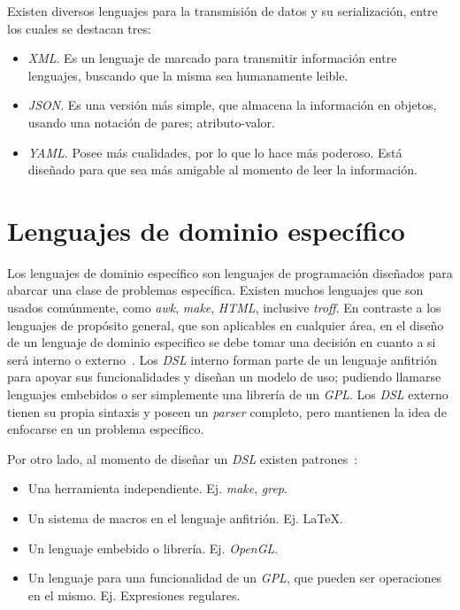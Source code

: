 \documentclass[12pt,letterpaper,titlepage,oneside,openright]{book}
\newcommand{\latex}{\LaTeX\xspace}
\begin{document}
Existen diversos lenguajes para la transmisión de datos y su serialización, entre los cuales se destacan tres:

\begin{itemize}
    \item \textit{XML}. Es un lenguaje de marcado para transmitir información entre lenguajes, buscando que la misma sea humanamente leible.
    \item \textit{JSON}. Es una versión más simple, que almacena la información en objetos, usando una notación de pares; atributo-valor. 
    \item \textit{YAML}. Posee más cualidades, por lo que lo hace más poderoso. Está diseñado para que sea más amigable al momento de leer la información.
\end{itemize}

\section{Lenguajes de dominio específico}

Los lenguajes de dominio específico son lenguajes de programación diseñados para abarcar una clase de problemas específica. Existen muchos lenguajes que son usados comúnmente, como \textit{awk}, \textit{make}, \textit{HTML}, inclusive \textit{troff}. En contraste a los lenguajes de propósito general, que son aplicables en cualquier área, en el diseño de un lenguaje de dominio especifico se debe tomar una decisión en cuanto a si será interno o externo~\cite{dlswork}. Los \textit{DSL} interno forman parte de un lenguaje anfitrión para apoyar sus funcionalidades y diseñan un modelo de uso; pudiendo llamarse lenguajes embebidos o ser simplemente una librería de un \textit{GPL}. Los \textit{DSL} externo tienen su propia sintaxis y poseen un \textit{parser} completo, pero mantienen la idea de enfocarse en un problema específico.

Por otro lado, al momento de diseñar un \textit{DSL} existen patrones~\cite{mernik2005and}:

\begin{itemize}
    \item Una herramienta independiente. Ej. \textit{make}, \textit{grep}.
    \item Un sistema de macros en el lenguaje anfitrión. Ej. \latex.
    \item Un lenguaje embebido o librería. Ej. \textit{OpenGL}.
    \item Un lenguaje para una funcionalidad de un \textit{GPL}, que pueden ser operaciones en el mismo. Ej. Expresiones regulares.
\end{itemize}
\end{document}
